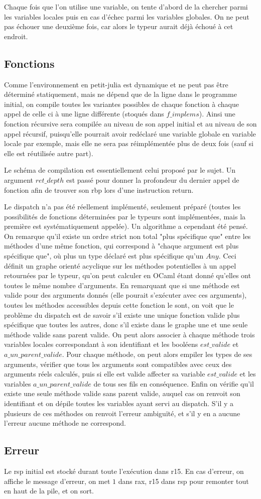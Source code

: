 \documentclass[10pt,a4paper]{article}
\begin{document}
Chaque fois que l'on utilise une variable, on tente d'abord de la chercher parmi les variables locales puis en cas d'échec parmi les variables globales. On ne peut pas échouer une deuxième fois, car alors le typeur aurait déjà échoué à cet endroit.

\subsection{Fonctions}

Comme l'environnement en petit-julia est dynamique et ne peut pas être déterminé
statiquement, mais ne dépend que de la ligne dans le programme initial, on compile
toutes les variantes possibles de chaque fonction à chaque appel de celle ci à une
ligne différente (stoqués dans $f\_implems$). Ainsi une fonction récursive sera
compilée au niveau de son appel initial et au niveau de son appel récursif, puisqu'elle
pourrait avoir redéclaré une variable globale en variable locale par exemple, mais elle
ne sera pas réimplémentée plus de deux fois (sauf si elle est réutilisée autre part).

Le schéma de compilation est essentiellement celui proposé par le sujet. Un argument
$ret\_depth$ est passé pour donner la profondeur du dernier appel de fonction afin
de trouver son rbp lors d'une instruction return.

Le dispatch n'a pas été réellement implémenté, seulement préparé (toutes les
possibilités de fonctions déterminées par le typeurs sont implémentées, mais la
première est systématiquement appelée). Un algorithme a cependant été pensé. On remarque
qu'il existe un ordre strict non total "plus spécifique que" entre les méthodes d'une même
fonction, qui correspond à "chaque argument est plus spécifique que", où plus un type
déclaré est plus spécifique qu'un $Any$. Ceci définit un graphe orienté acyclique sur
les méthodes potentielles à un appel retournées par le typeur, qu'on peut calculer en
OCaml étant donné qu'elles ont toutes le même nombre d'arguments. En remarquant que si
une méthode est valide pour des arguments donnés (elle pourait s'exécuter avec ces
arguments), toutes les méthodes accessibles depuis cette fonction le sont, on voit que
le problème du dispatch est de savoir s'il existe une unique fonction valide plus
spécifique que toutes les autres, donc s'il existe dans le graphe une et une seule
méthode valide sans parent valide.
On peut alors
associer à chaque méthode trois variables locales correspondant à son identifiant et
les booléens $est\_valide$ et $a\_un\_parent\_valide$. Pour chaque méthode, on peut
alors empiler les types de ses arguments, vérifier que tous les arguments sont compatibles
avec ceux des arguments réels calculés, puis si elle est valide affecter sa variable
$est\_valide$ et les variables $a\_un\_parent\_valide$ de tous ses fils en conséquence.
Enfin on vérifie qu'il existe une seule méthode valide sans parent valide, auquel cas
on renvoit son identifiant et on dépile toutes les variables ayant servi au dispatch. S'il y a plusieurs de ces méthodes on renvoit l'erreur ambiguïté, et s'il y en a aucune l'erreur aucune méthode ne correspond.

\subsection{Erreur}
Le rsp initial est stocké durant toute l'exécution dans r15. En cas d'erreur, on affiche le message d'erreur, on met $1$ dans rax, r15 dans rsp pour remonter tout en haut de la pile, et on sort.
\end{document}
